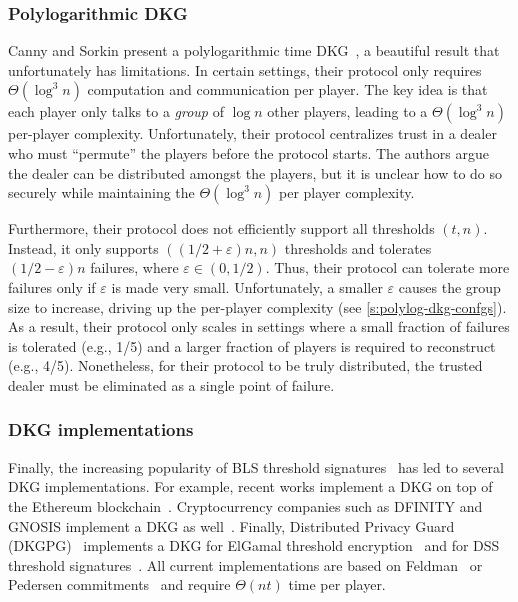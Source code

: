 \subsubsection{Polylogarithmic DKG}
Canny and Sorkin present a polylogarithmic time DKG~\cite{dkg-polylog}, a beautiful result that unfortunately has limitations.
In certain settings, their protocol only requires $\Theta(\log^3{n})$ computation and communication per player.
The key idea is that each player only talks to a \textit{group} of $\log{n}$ other players, leading to a $\Theta(\log^3{n})$ per-player complexity.
Unfortunately, their protocol centralizes trust in a dealer who must ``permute'' the players before the protocol starts.
The authors argue the dealer can be distributed amongst the players, but it is unclear how to do so securely while maintaining the $\Theta(\log^3{n})$ per player complexity.

Furthermore, their protocol does not efficiently support all thresholds $(t,n)$.
Instead, it only supports $((1/2 + \varepsilon)n, n)$ thresholds and tolerates $(1/2 - \varepsilon)n$ failures, where $\varepsilon \in (0,1/2)$.
Thus, their protocol can tolerate more failures only if $\varepsilon$ is made very small.
Unfortunately, a smaller $\varepsilon$ causes the group size to increase, driving up the per-player complexity (see \cref{s:polylog-dkg-confgs}).
As a result, their protocol only scales in settings where a small fraction of failures is tolerated (e.g., 1/5) and a larger fraction of players is required to reconstruct (e.g., 4/5).
Nonetheless, for their protocol to be truly distributed, the trusted dealer must be eliminated as a single point of failure.

\subsubsection{DKG implementations}
Finally, the increasing popularity of BLS threshold signatures~\cite{Boldyreva2003Threshold} has led to several DKG implementations.
For example, recent works implement a DKG on top of the Ethereum blockchain~\cite{SJSW19,Schindler2018EthDkgGithub,orbs-dkg-github}.
Cryptocurrency companies such as DFINITY and GNOSIS implement a DKG as well~\cite{dfinity-dkg,gnosis-dkg}.
Finally, Distributed Privacy Guard (DKGPG)~\cite{dkgpg} implements a DKG for ElGamal threshold encryption~\cite{DesmedtFrankel1990Threshold} and for DSS threshold signatures~\cite{Canetti1999Adaptive}.
All current implementations are based on Feldman~\cite{Feldman1987Practical} or Pedersen commitments~\cite{Pedersen1991AThreshold} and require $\Theta(nt)$ time per player.

